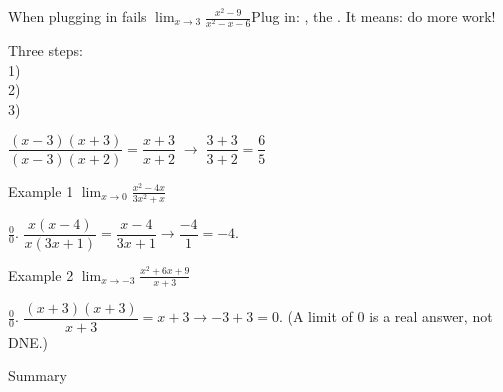 \begin{nrow}{When plugging in fails}
$\displaystyle\lim_{x\to3}\frac{x^2-9}{x^2-x-6}$\quad Plug in: , the . It means: do more work!\par\smallskip
\begin{minipage}[t]{0.3\linewidth}Three steps:\\ 1) \\ 2) \\ 3) \end{minipage}\hfill
\begin{minipage}[t]{0.66\linewidth}
\begin{workspace}[2.4cm]
$\dfrac{(x-3)(x+3)}{(x-3)(x+2)}=\dfrac{x+3}{x+2}\;\to\;\dfrac{3+3}{3+2}=\dfrac65$
\end{workspace}
\end{minipage}
\end{nrow}
\begin{nrow}{Example 1}
$\displaystyle\lim_{x\to0}\frac{x^2-4x}{3x^2+x}$
\begin{workspace}[2.2cm]
$\frac00$. \;$\dfrac{x(x-4)}{x(3x+1)}=\dfrac{x-4}{3x+1}\to\dfrac{-4}{1}=-4$.
\end{workspace}
\end{nrow}
\begin{nrow}{Example 2}
$\displaystyle\lim_{x\to-3}\frac{x^2+6x+9}{x+3}$
\begin{workspace}[2.2cm]
$\frac00$. \;$\dfrac{(x+3)(x+3)}{x+3}=x+3\to-3+3=0$. \;(A limit of $0$ is a real answer, not DNE.)
\end{workspace}
\end{nrow}
\begin{nrow}{Summary}
\else\vspace{2.4cm}\fi
\end{nrow}

